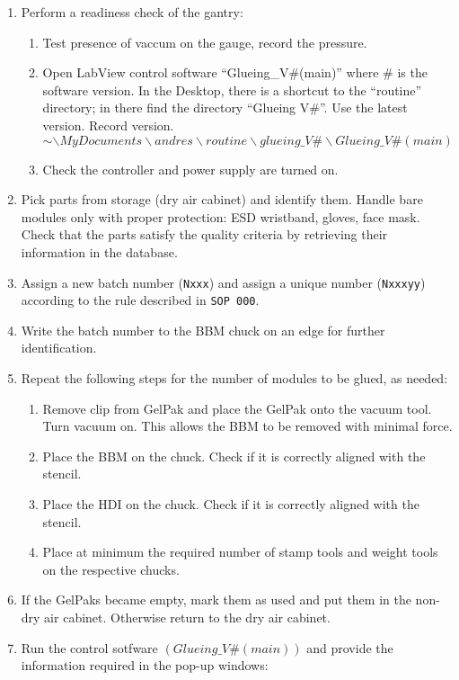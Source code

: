 \documentclass[12pt]{unlsilabsop}
\begin{document}
\begin{enumerate}
    \item Perform a readiness check of the gantry:
    \begin{enumerate}
        \item Test presence of vaccum on the gauge, record the pressure.
        \item Open LabView control software ``Glueing\_V\#(main)''  where $\#$ is the software version. In the Desktop, there is a shortcut to the ``routine'' directory; in there find the directory ``Glueing V\#''. Use the latest version. Record version.$$ \sim\backslash MyDocuments\backslash andres\backslash routine\backslash glueing\_V\#\backslash Glueing\_V\#(main)$$
        \item Check the controller and power supply are turned on.
    \end{enumerate}
    \item Pick parts from storage (dry air cabinet) and identify them. Handle bare modules only with proper protection: ESD wristband, gloves, face mask. Check that the parts satisfy the quality criteria by retrieving their information in the database.
    \item Assign a new batch number (\texttt{Nxxx}) and assign a unique number (\texttt{Nxxxyy}) according to the rule described in \texttt{SOP~000}.
    \item Write the batch number to the BBM chuck on an edge for further identification.
    \item Repeat the following steps for the number of modules to be glued, as needed:
    \begin{enumerate}
        \item Remove clip from GelPak and place the GelPak onto the vacuum tool. Turn vacuum on. This allows the BBM to be removed with minimal force.
        \item Place the BBM on the chuck. Check if it is correctly aligned with the stencil.
        \item Place the HDI on the chuck. Check if it is correctly aligned with the stencil.
        \item Place at minimum the required number of stamp tools and weight tools on the respective chucks.
    \end{enumerate}
    \item If the GelPaks became empty, mark them as used and put them in the non-dry air cabinet. Otherwise return to the dry air cabinet.
    \item Run the control sotfware $(Glueing\_V\#(main))$ and provide the information required in the pop-up windows:

\end{enumerate}
\end{document}

